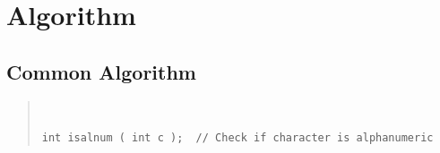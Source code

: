 \chapter{Algorithm}\label{chp:Alg}

\section{Common Algorithm}

\begin{quote}
\begin{verbatim}


int isalnum ( int c );  // Check if character is alphanumeric
\end{verbatim}
\end{quote}


